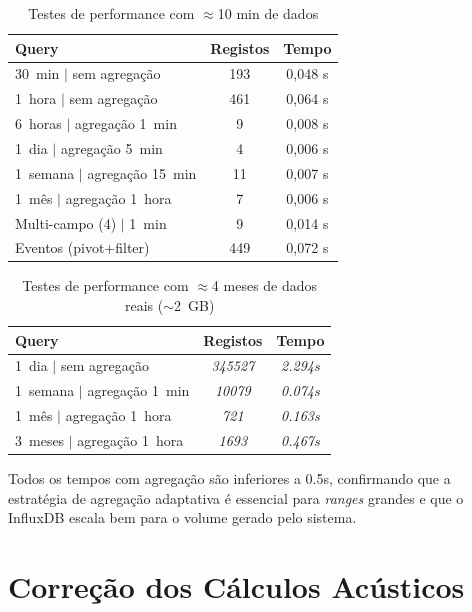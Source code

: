 \documentclass[12pt,a4paper]{report}
\begin{document}
\begin{table}[H]
\centering\small
\caption{Testes de performance com $\approx$10 min de dados}
\label{tab:perf1}
\begin{tabular}{lcc}
\toprule
\textbf{Query} & \textbf{Registos} & \textbf{Tempo} \\
\midrule
30~min $|$ sem agregação    & 193 & 0{,}048 s \\
1~hora $|$ sem agregação    & 461 & 0{,}064 s \\
6~horas $|$ agregação 1~min &   9 & 0{,}008 s \\
1~dia $|$ agregação 5~min   &   4 & 0{,}006 s \\
1~semana $|$ agregação 15~min & 11 & 0{,}007 s \\
1~mês $|$ agregação 1~hora  &   7 & 0{,}006 s \\
Multi-campo (4) $|$ 1~min   &   9 & 0{,}014 s \\
Eventos (pivot+filter)      & 449 & 0{,}072 s \\
\bottomrule
\end{tabular}
\end{table}

\begin{table}[H]
\centering\small
\caption{Testes de performance com $\approx$4 meses de dados reais ($\sim$2~GB)}
\label{tab:perf2}
\begin{tabular}{lcc}
\toprule
\textbf{Query} & \textbf{Registos} & \textbf{Tempo} \\
\midrule
1~dia $|$ sem agregação      & \textit{345527} & \textit{2.294s} \\
1~semana $|$ agregação 1~min & \textit{10079} & \textit{0.074s} \\
1~mês $|$ agregação 1~hora   & \textit{721} & \textit{0.163s} \\
3~meses $|$ agregação 1~hora & \textit{1693} & \textit{0.467s} \\
\bottomrule
\end{tabular}
\end{table}

Todos os tempos com agregação são inferiores a 0.5s, confirmando que a estratégia de agregação adaptativa é essencial para \textit{ranges} grandes e que o InfluxDB escala bem para o volume gerado pelo sistema.

\section{Correção dos Cálculos Acústicos}
\label{sec:acustica}
\end{document}
